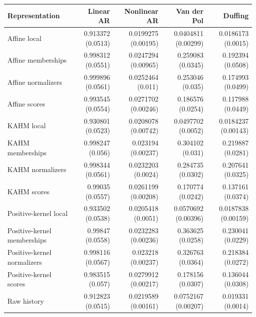 \begin{tabular}{lrrrr}
\toprule
Representation & Linear AR & Nonlinear AR & Van der Pol & Duffing \\
\midrule
Affine local & 0.913372 (0.0513) & 0.0199275 (0.00195) & 0.0404811 (0.00299) & 0.0186173 (0.0015) \\
Affine memberships & 0.998312 (0.0551) & 0.0247294 (0.00965) & 0.259083 (0.0345) & 0.192394 (0.0508) \\
Affine normalizers & 0.999896 (0.0561) & 0.0252464 (0.011) & 0.253046 (0.035) & 0.174993 (0.0499) \\
Affine scores & 0.993545 (0.0554) & 0.0271702 (0.00246) & 0.186576 (0.0254) & 0.117988 (0.0449) \\
KAHM local & 0.930801 (0.0523) & 0.0208078 (0.00742) & 0.0497702 (0.0052) & 0.0184237 (0.00143) \\
KAHM memberships & 0.998247 (0.056) & 0.023194 (0.00237) & 0.304102 (0.031) & 0.219887 (0.0281) \\
KAHM normalizers & 0.998344 (0.0561) & 0.0232203 (0.0024) & 0.284735 (0.0302) & 0.207641 (0.0325) \\
KAHM scores & 0.99035 (0.0557) & 0.0261199 (0.00208) & 0.170774 (0.0242) & 0.137161 (0.0374) \\
Positive-kernel local & 0.933502 (0.0538) & 0.0205418 (0.0051) & 0.0570692 (0.00396) & 0.0187838 (0.00159) \\
Positive-kernel memberships & 0.99847 (0.0558) & 0.0232283 (0.00236) & 0.363625 (0.0258) & 0.230041 (0.0229) \\
Positive-kernel normalizers & 0.998116 (0.0567) & 0.023218 (0.00237) & 0.326763 (0.0364) & 0.218384 (0.0272) \\
Positive-kernel scores & 0.983515 (0.057) & 0.0279912 (0.00217) & 0.178156 (0.0307) & 0.136044 (0.0308) \\
Raw history & 0.912823 (0.0515) & 0.0219589 (0.00161) & 0.0752167 (0.00207) & 0.019331 (0.0014) \\
\bottomrule
\end{tabular}
